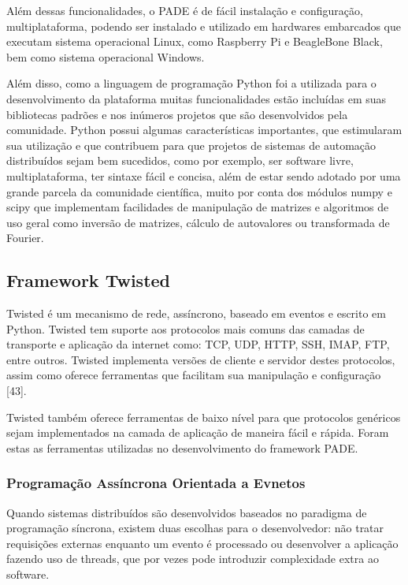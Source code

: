 \documentclass[journal]{IEEEtran}
\begin{document}
Além dessas funcionalidades, o PADE é de fácil instalação e configuração, multiplataforma, podendo ser instalado e utilizado em hardwares embarcados que executam sistema operacional Linux, como Raspberry Pi e BeagleBone Black, bem como sistema operacional Windows.

Além disso, como a linguagem de programação Python foi a utilizada para o desenvolvimento da plataforma muitas funcionalidades estão incluídas em suas bibliotecas padrões e nos inúmeros projetos que são desenvolvidos pela comunidade. Python possui algumas características importantes, que estimularam sua utilização e que contribuem para que projetos de sistemas de automação distribuídos sejam bem sucedidos, como por exemplo, ser software livre, multiplataforma, ter sintaxe fácil e concisa, além de estar sendo adotado por uma grande parcela da comunidade científica, muito por conta dos módulos numpy e scipy que implementam facilidades de manipulação de matrizes e algoritmos de uso geral como inversão de matrizes, cálculo de autovalores ou transformada de Fourier.

\subsection{Framework Twisted}

Twisted é um mecanismo de rede, assíncrono, baseado em eventos e escrito em Python. Twisted tem suporte aos protocolos mais comuns das camadas de transporte e aplicação da internet como: TCP, UDP, HTTP, SSH, IMAP, FTP, entre outros. Twisted implementa versões de cliente e servidor destes protocolos, assim como oferece ferramentas que facilitam sua manipulação e configuração [43].

Twisted também oferece ferramentas de baixo nível para que protocolos genéricos sejam implementados na camada de aplicação de maneira fácil e rápida. Foram estas as ferramentas utilizadas no desenvolvimento do framework PADE.

\subsubsection{Programação Assíncrona Orientada a Evnetos} 

Quando sistemas distribuídos são desenvolvidos baseados no paradigma de programação síncrona, existem duas escolhas para o desenvolvedor: não tratar requisições externas enquanto um evento é processado ou desenvolver a aplicação fazendo uso de threads, que por vezes pode introduzir complexidade extra ao software.
\end{document}
